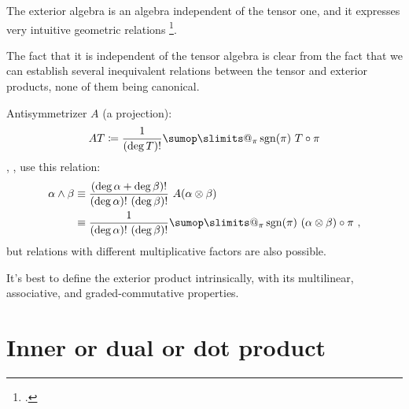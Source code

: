 \documentclass[\ifafour a4paper,12pt,\else a5paper,10pt,\fi%
onecolumn,oneside,article,%
british%
]{memoir}
\makeatletter
\theoremstyle{remark}
\theoremstyle{innote}
\def\sum{\DOTSI\sumop\slimits@}
\newcommand*{\citep}{\footcites}
\newcommand*{\defd}{\coloneqq}
\renewcommand*{\|}[1][]{\nonscript\,#1\vert\nonscript\;\mathopen{}}
\newcommand*{\cf}{{cf.}}
\DeclareMathOperator{\sgn}{sgn}
\makeatother
\begin{document}
The exterior algebra is an algebra independent of the tensor one, and it
expresses very intuitive geometric relations
\citep[\cf][]{deschamps1970,deschamps1981}.

The fact that it is independent of the tensor algebra is clear from the
fact that we can establish several inequivalent relations between the tensor and
exterior products, none of them being canonical.


Antisymmetrizer $A$ (a projection):
\begin{equation}
  \label{eq:antisymmetrizer}
  AT \defd \frac{1}{(\deg T)!} \sum_{\pi}\sgn(\pi)\ T\circ\pi
\end{equation}
\textcite{abrahametal1983_r1988}, \textcite{choquetbruhatetal1977_r1996},
\textcite{bossavit1991} use this relation:
\begin{equation}
  \label{eq:wedge_marsden}
  \begin{split}
    \alpha \land \beta &\equiv
    \frac{(\deg \alpha+\deg \beta)!}{(\deg \alpha)!\ (\deg \beta)!}\ 
    A(\alpha \otimes \beta)
  \\
  &\equiv \frac{1}{(\deg \alpha)!\ (\deg \beta)!}
  \sum_{\pi}\sgn(\pi)\ (\alpha \otimes \beta)\circ\pi \ ,
\end{split}
\end{equation}
but relations with different multiplicative factors are also possible.

It's best to define the exterior product intrinsically, with its
multilinear, associative, and graded-commutative properties.

\section{Inner or dual or dot product}
\label{sec:inner_product}
\end{document}

